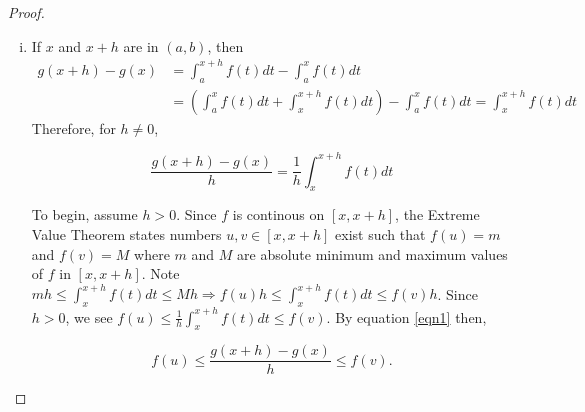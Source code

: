 \documentclass[a4paper,8pt]{article}
\begin{document}
\begin{outline}
    \begin{proof}
      \begin{enumerate}[i.]
        \item
          If \(x\) and \(x+h\) are in \((a, b)\), then
          \begin{align*}
            g(x+h)-g(x)&=\int_a^{x+h}f(t)dt-\int_a^xf(t)dt\\
                       &=\left(\int_a^xf(t)dt + \int_x^{x+h}f(t)dt\right)-\int_a^{x}f(t)dt
                        =\int_x^{x+h}f(t)dt
          \end{align*}
          Therefore, for \(h \neq 0\),

          \begin{equation}
            \label{eqn1}
            \frac{g(x+h)-g(x)}{h} = \frac{1}{h}\int_x^{x+h}f(t)dt
          \end{equation}

          To begin, assume \(h > 0\). Since \(f\) is continous on \([x, x+h]\), the Extreme Value Theorem states
          numbers \(u, v\in [x, x+h]\) exist such that \(f(u)=m\) and \(f(v)=M\) where \(m\) and \(M\) are absolute
          minimum and maximum values of \(f\) in \([x, x+h]\). Note \(mh \leq \int_x^{x+h}f(t)dt \leq Mh
          \Rightarrow f(u)h \leq\int_x^{x+h}f(t)dt \leq f(v)h\). Since \(h > 0\), we see \(f(u) \leq
          \frac{1}{h}\int_x^{x+h}f(t)dt \leq f(v)\). By equation \eqref{eqn1} then,

          \begin{equation}
            \label{eqn2}
            f(u) \leq \frac{g(x+h)-g(x)}{h} \leq f(v)\text{.}
          \end{equation}


\end{enumerate}
\end{proof}
\end{outline}
\end{document}
